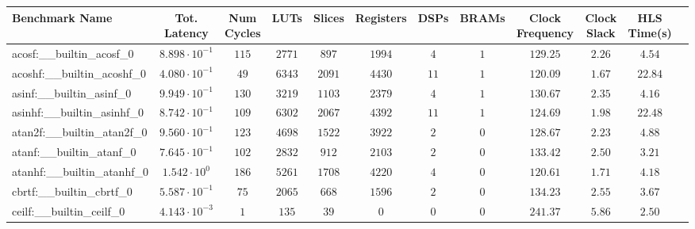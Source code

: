 \begin{tabular}{|l|c|c|c|c|c|c|c|c|c|c|c|}
\hline
Benchmark Name                            & Tot. Latency            & Num Cycles & LUTs       & Slices    & Registers & DSPs    & BRAMs & Clock Frequency & Clock Slack & HLS Time(s) \\
\hline
acosf:\_\_builtin\_acosf\_0               & $ 8.898 \cdot 10^{-1} $ & $ 115    $ & $ 2771   $ & $ 897   $ & $ 1994  $ & $ 4   $ & $ 1 $ & $ 129.25      $ & $ 2.26    $ & $ 4.54    $ \\
acoshf:\_\_builtin\_acoshf\_0             & $ 4.080 \cdot 10^{-1} $ & $ 49     $ & $ 6343   $ & $ 2091  $ & $ 4430  $ & $ 11  $ & $ 1 $ & $ 120.09      $ & $ 1.67    $ & $ 22.84   $ \\
asinf:\_\_builtin\_asinf\_0               & $ 9.949 \cdot 10^{-1} $ & $ 130    $ & $ 3219   $ & $ 1103  $ & $ 2379  $ & $ 4   $ & $ 1 $ & $ 130.67      $ & $ 2.35    $ & $ 4.16    $ \\
asinhf:\_\_builtin\_asinhf\_0             & $ 8.742 \cdot 10^{-1} $ & $ 109    $ & $ 6302   $ & $ 2067  $ & $ 4392  $ & $ 11  $ & $ 1 $ & $ 124.69      $ & $ 1.98    $ & $ 22.48   $ \\
atan2f:\_\_builtin\_atan2f\_0             & $ 9.560 \cdot 10^{-1} $ & $ 123    $ & $ 4698   $ & $ 1522  $ & $ 3922  $ & $ 2   $ & $ 0 $ & $ 128.67      $ & $ 2.23    $ & $ 4.88    $ \\
atanf:\_\_builtin\_atanf\_0               & $ 7.645 \cdot 10^{-1} $ & $ 102    $ & $ 2832   $ & $ 912   $ & $ 2103  $ & $ 2   $ & $ 0 $ & $ 133.42      $ & $ 2.50    $ & $ 3.21    $ \\
atanhf:\_\_builtin\_atanhf\_0             & $ 1.542 \cdot 10^{0}  $ & $ 186    $ & $ 5261   $ & $ 1708  $ & $ 4220  $ & $ 4   $ & $ 0 $ & $ 120.61      $ & $ 1.71    $ & $ 4.18    $ \\
cbrtf:\_\_builtin\_cbrtf\_0               & $ 5.587 \cdot 10^{-1} $ & $ 75     $ & $ 2065   $ & $ 668   $ & $ 1596  $ & $ 2   $ & $ 0 $ & $ 134.23      $ & $ 2.55    $ & $ 3.67    $ \\
ceilf:\_\_builtin\_ceilf\_0               & $ 4.143 \cdot 10^{-3} $ & $ 1      $ & $ 135    $ & $ 39    $ & $ 0     $ & $ 0   $ & $ 0 $ & $ 241.37      $ & $ 5.86    $ & $ 2.50    $ \\

\end{tabular}
